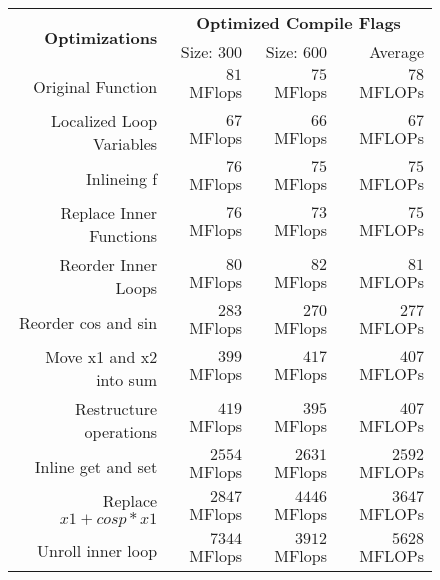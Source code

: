 \documentclass[portrait,a4paper]{article}
\begin{document}
\begin{figure}[H]
    \centering
    \begin{tabular}{r|rrr|}
        \multirow{2}{*}{\textbf{Optimizations}} & \multicolumn{3}{|c|}{\textbf{Optimized Compile Flags}}\\ 
                               & Size: $300$     & Size: $600$    & Average \\ \hline
        Original Function & $81$ MFlops & $75$ MFlops & $78$ MFLOPs \\
        Localized Loop Variables & $67$ MFlops & $66$ MFlops & $67$ MFLOPs \\
        Inlineing f      & $76$ MFlops & $75$ MFlops & $75$ MFLOPs \\
        Replace Inner Functions & $76$ MFlops & $73$ MFlops & $75$ MFLOPs \\
        Reorder Inner Loops & $80$ MFlops & $82$ MFlops & $81$ MFLOPs \\
        Reorder cos and sin & $283$ MFlops & $270$ MFlops & $277$ MFLOPs \\
        Move x1 and x2 into sum & $399$ MFlops & $417$ MFlops & $407$ MFLOPs \\
        Restructure operations  & $419$ MFlops & $395$ MFlops & $407$ MFLOPs \\
        Inline get and set & $2554$ MFlops & $2631$ MFlops & $2592$ MFLOPs \\
        Replace $x1+cosp*x1$ & $2847$ MFlops & $4446$ MFlops & $3647$ MFLOPs \\
        Unroll inner loop & $7344$ MFlops & $3912$ MFlops & $5628$ MFLOPs \\
    \end{tabular}

\end{figure}


%
%
%
%
%
%
%
%
%
%
\end{document}
